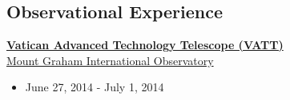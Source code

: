 \documentclass[margin]{res}
\begin{document}
\begin{resume}







\section{Observational Experience}
{\href{http://vaticanobservatory.org/VATT/}{\bf  Vatican Advanced Technology Telescope (VATT)}} \\
\href{http://mgio.arizona.edu}{Mount Graham International Observatory}
\begin{itemize}\itemsep -2pt
   \item[] June 27, 2014 - July 1, 2014
\end{itemize}








\end{resume}
\end{document}
